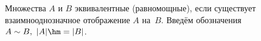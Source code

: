 

Множества $A$ и $B$ эквивалентные (равномощные), если существует взаимнооднозначное отображение $A$ на~$B$.
Введём обозначения $A\sim B,\ |A|\hm=|B|$.

